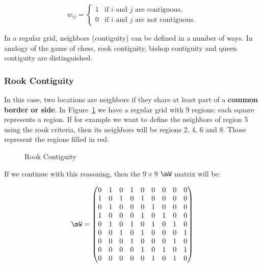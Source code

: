 \begin{equation*}
  w_{ij}= 
   \begin{cases}
      1 & \mbox{if $i$ and $j$ are contiguous,} \\ 
      0 & \mbox{if $i$ and $j$ are not contiguous.} 
   \end{cases}
\end{equation*}

In a regular grid, neighbors (contiguity) can be defined in a number of ways. In analogy of the game of chess, rook contiguity, bishop contiguity and queen contiguity are distinguished.

\subsubsection{Rook Contiguity}

In this case, two locations are neighbors if they share at least part of a \textbf{common border or side}. In Figure~\ref{fig:Rook_cont_grid} we have a regular grid with 9 regions: each square represents a region. If for example we want to define the neighbors of region 5 using the rook criteria, then its neighbors will be regions 2, 4, 6 and 8. Those represent the regions filled in red. 

\begin{figure}[h]
\caption{Rook Contiguity}
\label{fig:Rook_cont_grid}
\centering
{}
\end{figure}

If we continue with this reasoning, then the $9\times 9$ $\mW$ matrix will be:

\begin{equation}
  \mW = 
  \begin{pmatrix}
     0 & 1 & 0 & 1 & 0 & 0 & 0 & 0 & 0 \\
     1 & 0 & 1 & 0 & 1 & 0 & 0 & 0 & 0 \\
     0 & 1 & 0 & 0 & 0 & 1 & 0 & 0 & 0 \\
     1 & 0 & 0 & 0 & 1 & 0 & 1 & 0 & 0 \\
     0 & 1 & 0 & 1 & 0 & 1 & 0 & 1 & 0 \\
     0 & 0 & 1 & 0 & 1 & 0 & 0 & 0 & 1 \\
     0 & 0 & 0 & 1 & 0 & 0 & 0 & 1 & 0 \\
     0 & 0 & 0 & 0 & 1 & 0 & 1 & 0 & 1 \\
     0 & 0 & 0 & 0 & 0 & 1 & 0 & 1 & 0 \\
  \end{pmatrix}
\end{equation}

